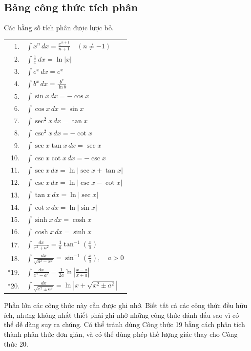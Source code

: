 \documentclass[12pt,a4paper]{article}
\begin{document}
\subsection*{Bảng công thức tích phân}
Các hằng số tích phân được lược bỏ.
\begin{longtable}{@{}r p{.85\linewidth}@{}}
1. & $\displaystyle\int x^n\,dx=\frac{x^{n+1}}{n+1}\quad(n\ne-1)$\\[9pt]
2. & $\displaystyle\int\frac1x\,dx=\ln|x|$\\[9pt]
3. & $\displaystyle\int e^x\,dx=e^x$\\[9pt]
4. & $\displaystyle\int b^x\,dx=\frac{b^x}{\ln b}$\\[9pt]
5. & $\displaystyle\int\sin x\,dx=-\cos x$\\[9pt]
6. & $\displaystyle\int\cos x\,dx=\sin x$\\[9pt]
7. & $\displaystyle\int\sec^2x\,dx=\tan x$\\[9pt]
8. & $\displaystyle\int\csc^2x\,dx=-\cot x$\\[9pt]
9. & $\displaystyle\int\sec x\tan x\,dx=\sec x$\\[9pt]
10. & $\displaystyle\int\csc x\cot x\,dx=-\csc x$\\[9pt]
11. & $\displaystyle\int\sec x\,dx=\ln|\sec x+\tan x|$\\[9pt]
12. & $\displaystyle\int\csc x\,dx=\ln|\csc x-\cot x|$\\[9pt]
13. & $\displaystyle\int\tan x\,dx=\ln|\sec x|$\\[9pt]
14. & $\displaystyle\int\cot x\,dx=\ln|\sin x|$\\[9pt]
15. & $\displaystyle\int\sinh x\,dx=\cosh x$\\[9pt]
16. & $\displaystyle\int\cosh x\,dx=\sinh x$\\[9pt]
17. & $\displaystyle\int\frac{dx}{x^2+a^2}=\frac1a\tan^{-1}\left(\frac xa\right)$\\[9pt]
18. & $\displaystyle\int\frac{dx}{\sqrt{a^2-x^2}}=\sin^{-1}\left(\frac xa\right),\quad a>0$\\[9pt]
*19. & $\displaystyle\int\frac{dx}{x^2-a^2}=\frac1{2a}\ln\left|\frac{x-a}{x+a}\right|$\\[9pt]
*20. & $\displaystyle\int\frac{dx}{\sqrt{x^2\pm a^2}}=\ln\left|x+\sqrt{x^2\pm a^2}\right|$\\
\end{longtable}
Phần lớn các công thức này cần được ghi nhớ. Biết tất cả các công thức đều hữu ích, nhưng không nhất thiết phải ghi nhớ những công thức đánh dấu sao vì có thể dễ dàng suy ra chúng. Có thể tránh dùng Công thức 19 bằng cách phân tích thành phân thức đơn giản, và có thể dùng phép thế lượng giác thay cho Công thức 20.
\end{document}
